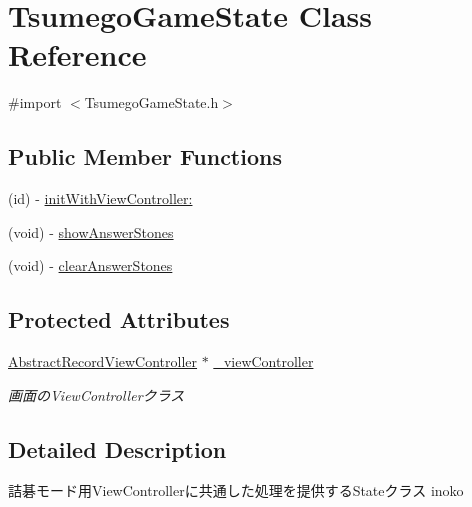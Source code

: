 \hypertarget{interface_tsumego_game_state}{
\section{TsumegoGameState Class Reference}
\label{interface_tsumego_game_state}
}


{\ttfamily \#import $<$TsumegoGameState.h$>$}

\subsection*{Public Member Functions}
\begin{DoxyCompactItemize}
\item 
(id) -\/ \hyperlink{interface_tsumego_game_state_a96d7668dd251c1cd46e203bc156b3964}{initWithViewController:}
\item 
(void) -\/ \hyperlink{interface_tsumego_game_state_a31ca5b884383acbd82d002f3bf3e472c}{showAnswerStones}
\item 
(void) -\/ \hyperlink{interface_tsumego_game_state_aed7c8cf45d4c68d5555b93fb4c1c71b1}{clearAnswerStones}
\end{DoxyCompactItemize}
\subsection*{Protected Attributes}
\begin{DoxyCompactItemize}
\item 
\hypertarget{interface_tsumego_game_state_a65c69d9e7db6e01fca1c760168ca28ce}{
\hyperlink{interface_abstract_record_view_controller}{AbstractRecordViewController} $\ast$ \hyperlink{interface_tsumego_game_state_a65c69d9e7db6e01fca1c760168ca28ce}{\_\-viewController}}
\label{interface_tsumego_game_state_a65c69d9e7db6e01fca1c760168ca28ce}

\begin{DoxyCompactList}\small\item\em 画面のViewControllerクラス \end{DoxyCompactList}\end{DoxyCompactItemize}


\subsection{Detailed Description}
詰碁モード用ViewControllerに共通した処理を提供するStateクラス  inoko 

